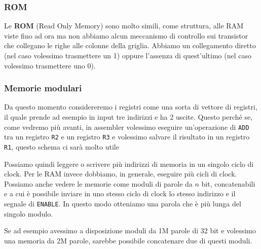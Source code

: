 \subsubsection{ROM}
Le \textbf{ROM} (Read Only Memory) sono molto simili, come struttura, alle RAM viste fino ad ora
ma non abbiamo alcun meccanismo di controllo sui transistor che collegano le righe alle colonne
della griglia. Abbiamo un collegamento diretto (nel caso volessimo trasmettere un 1) oppure
l'assenza di quest'ultimo (nel caso volessimo trasmettere uno 0).

\subsubsection{Memorie modulari}
Da questo momento considereremo i registri come una sorta di vettore di registri, il quale prende
ad esempio in input tre indirizzi e ha 2 uscite. Questo perché se, come vedremo più avanti, in
assembler volessimo eseguire un'operazione di \verb|ADD| tra un registro \verb|R2| e un registro
\verb|R3| e volessimo salvare il risultato in un registro \verb|R1|, questo schema ci sarà molto
utile
\begin{center}
\end{center}
Possiamo quindi leggere o scrivere più indirizzi di memoria in un singolo ciclo di clock. Per le
RAM invece dobbiamo, in generale, eseguire più cicli di clock. Possiamo anche vedere le memorie
come moduli di parole da $n$ bit, concatenabili e a cui è possibile inviare in uno stesso ciclo di
clock lo stesso indirizzo e il segnale di \verb|ENABLE|. In questo modo otteniamo una parola che
è più lunga del singolo modulo.

Se ad esempio avessimo a disposizione moduli da 1M parole di 32 bit e volessimo una memoria da 2M
parole, sarebbe possibile concatenare due di questi moduli.

